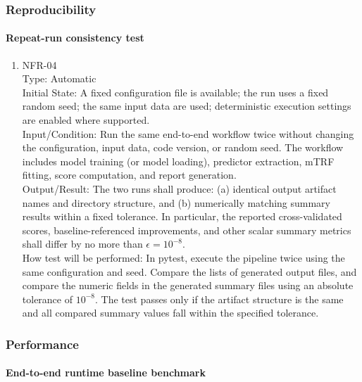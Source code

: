 \documentclass[12pt, titlepage]{article}
\begin{document}
\subsubsection{Reproducibility}

\paragraph{Repeat-run consistency test}

\begin{enumerate}

\item{NFR-04\\}
Type: Automatic \\
Initial State: A fixed configuration file is available; the run uses a fixed random seed; the same input data are used; deterministic execution settings are enabled where supported. \\
Input/Condition: Run the same end-to-end workflow twice without changing the configuration, input data, code version, or random seed. The workflow includes model training (or model loading), predictor extraction, mTRF     fitting, score computation, and report generation. \\
Output/Result: The two runs shall produce:
(a) identical output artifact names and directory structure, and
(b) numerically matching summary results within a fixed tolerance.
In particular, the reported cross-validated scores, baseline-referenced
improvements, and other scalar summary metrics shall differ by no more than
$\epsilon = 10^{-8}$. \\
How test will be performed: In pytest, execute the pipeline twice using the
same configuration and seed. Compare the lists of generated output files, and compare the numeric fields in the generated summary files using an absolute tolerance of $10^{-8}$. The test passes only if the artifact structure is the same and all compared summary values fall within the specified tolerance.

\end{enumerate}

\subsubsection{Performance}

\paragraph{End-to-end runtime baseline benchmark}
\end{document}
